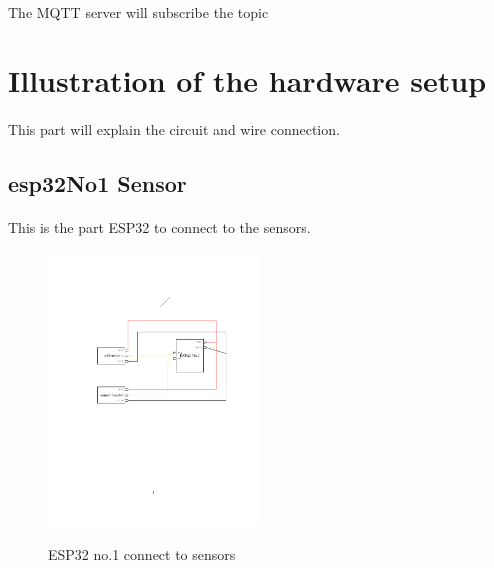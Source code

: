 \documentclass[a4paper, 12pt]{article}        %
\begin{document}
    \paragraph{}
    The MQTT server will subscribe the topic
    \pagebreak
    \section{Illustration of the hardware setup}\label{sec:illustration-of-the-hardware-setup}
    \paragraph{}
    This part will explain the circuit and wire connection.

    \blindtext{}


    \pagebreak
    \subsection{esp32No1 Sensor}\label{subsec:esp32no1-sensor}
    \paragraph{}
    This is the part ESP32 to connect to the sensors.

    \blindtext{}



    \begin{figure}[h]
        \caption{ESP32 no.1 connect to sensors}
        \centering
        \includegraphics[width=0.5\textwidth]{../out/ESP32_No1_connect_Sensor}
        \label{fig:figure2}
    \end{figure}
\end{document}
